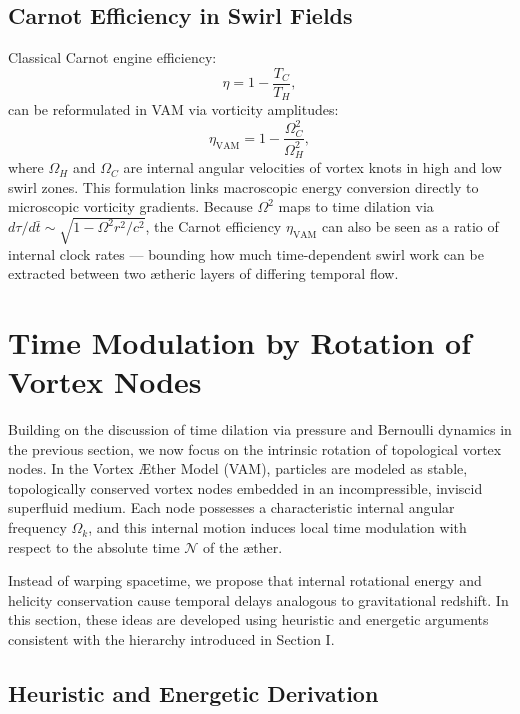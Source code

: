 \documentclass[preprint]{revtex4-2}
\begin{document}
\subsection*{Carnot Efficiency in Swirl Fields}

Classical Carnot engine efficiency:
\begin{equation}
    \eta = 1 - \frac{T_C}{T_H},
\end{equation}
can be reformulated in VAM via vorticity amplitudes:
\begin{equation}
    \eta_\text{VAM} = 1 - \frac{\Omega_C^2}{\Omega_H^2},
\end{equation}
where $\Omega_H$ and $\Omega_C$ are internal angular velocities of vortex knots in high and low swirl zones. This formulation links macroscopic energy conversion directly to microscopic vorticity gradients.
Because $\Omega^2$ maps to time dilation via $d\tau/d\bar{t} \sim \sqrt{1 - \Omega^2 r^2/c^2}$, the Carnot efficiency $\eta_\text{VAM}$ can also be seen as a ratio of internal clock rates — bounding how much time-dependent swirl work can be extracted between two ætheric layers of differing temporal flow.


\section{Time Modulation by Rotation of Vortex Nodes}

Building on the discussion of time dilation via pressure and Bernoulli dynamics in the previous section, we now focus on the intrinsic rotation of topological vortex nodes. In the Vortex Æther Model (VAM), particles are modeled as stable, topologically conserved vortex nodes embedded in an incompressible, inviscid superfluid medium. Each node possesses a characteristic internal angular frequency $\Omega_k$, and this internal motion induces local time modulation with respect to the absolute time $\mathcal{N}$ of the æther.

Instead of warping spacetime, we propose that internal rotational energy and helicity conservation cause temporal delays analogous to gravitational redshift. In this section, these ideas are developed using heuristic and energetic arguments consistent with the hierarchy introduced in Section I.

\subsection{Heuristic and Energetic Derivation}
\end{document}
